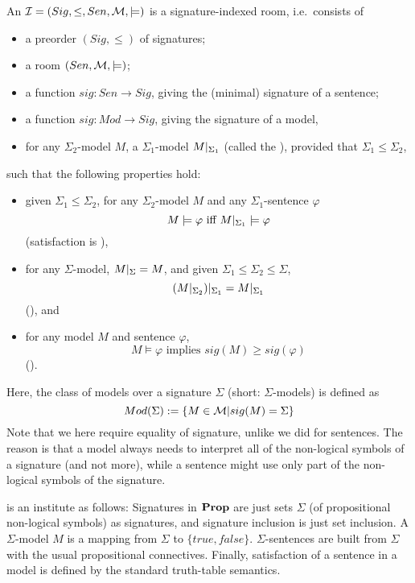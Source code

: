 \documentclass[%
\ifpretendfinal
final%
\else
draft%
\fi,
a4paper,
wd]{isov2}
\begin{document}
\begin{definition}\label{def:sigroom}
An  $\cI=(Sig,\leq,Sen,\cM,\models)$ is a signature-indexed room, i.e.\ consists of
\begin{itemize}
\item a preorder $(Sig,\leq)$ of signatures;
\item a room $(Sen,\cM,\models)$;
\item a function $sig: Sen\to Sig$, giving the (minimal) signature
of a sentence;
\item a function $sig: Mod\to Sig$, giving the signature
of a model, 
\item for any $\Sigma_2$-model $M$, a $\Sigma_1$-model
  $M|_{\Sigma_1}$ (called the ), provided that
  $\Sigma_1\leq\Sigma_2$,
\end{itemize}
such that the following properties hold:
\begin{itemize}
\item given $\Sigma_1\leq\Sigma_2$, for any $\Sigma_2$-model $M$
and any $\Sigma_1$-sentence $\varphi$
$$M\models\varphi\mbox{ iff }M|_{\Sigma_1}\models\varphi$$
(satisfaction is ),
\item for any $\Sigma$-model, $M|_{\Sigma}=M$, 
and given $\Sigma_1\leq\Sigma_2\leq\Sigma$, 
$$(M|_{\Sigma_2})|_{\Sigma_1}=M|_{\Sigma_1}$$ 
(), and
\item for any model $M$ and sentence $\varphi$,
$$M\models\varphi\mbox{ implies }sig(M)\geq sig(\varphi)$$
().
\end{itemize}
\end{definition}
Here, the class of models over a signature $\Sigma$ (short:
$\Sigma$-models) is defined as 
$$Mod(\Sigma):=\{M\in\cM | sig(M)=\Sigma\}$$ 
Note that we here require equality of signature, unlike we
did for sentences.  The reason is that a model always needs to
interpret all of the non-logical symbols of a signature (and not more), while a
sentence might use only part of the non-logical symbols of the signature.

\begin{example}\label{Prop} 
   is an institute as follows: Signatures in $\mathbf{Prop}$ are just sets
  $\Sigma$ (of propositional non-logical symbols) as signatures, and signature
  inclusion is just set inclusion. A $\Sigma$-model $M$ is a mapping
  from $\Sigma$ to $\{\mathit{true},\mathit{false}\}$.
  $\Sigma$-sentences are built from $\Sigma$ with the usual
  propositional connectives.  Finally, satisfaction of a sentence in a
  model is defined by the standard truth-table semantics.
\end{example}
\end{document}
